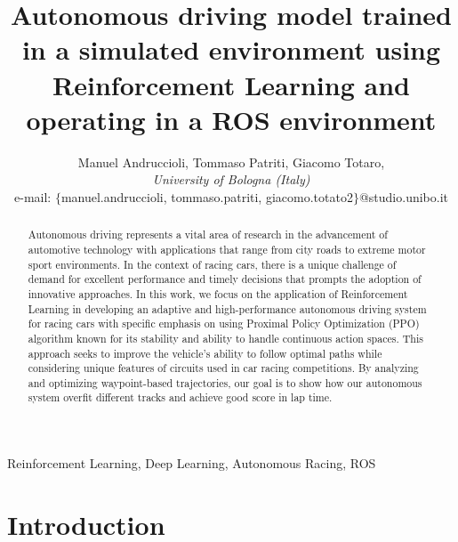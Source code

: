 \documentclass[conference]{IEEEtran}
\begin{document}
\title{
    Autonomous driving model trained in a simulated environment using Reinforcement Learning and operating in a ROS environment
}

\author{Manuel Andruccioli,
Tommaso Patriti,
Giacomo Totaro,\\ 
\textit{University of Bologna (Italy)} \\
e-mail: $\{$manuel.andruccioli, tommaso.patriti, giacomo.totato2$\}$@studio.unibo.it }

\maketitle

\begin{abstract}
Autonomous driving represents a vital area of research in the advancement of automotive technology with applications that range from city roads to extreme motor sport environments.
%
In the context of racing cars, there is a unique challenge of demand for excellent performance and timely decisions that prompts the adoption of innovative approaches.
%
In this work, we focus on the application of Reinforcement Learning in developing an adaptive and high-performance autonomous driving system for racing cars with specific emphasis on using Proximal Policy Optimization (PPO) algorithm known for its stability and ability to handle continuous action spaces.
%
This approach seeks to improve the vehicle's ability to follow optimal paths while considering unique features of circuits used in car racing competitions.
%
By analyzing and optimizing waypoint-based trajectories, our goal is to show how our autonomous system overfit different tracks and achieve good score in lap time.
%
%
%
\end{abstract}


\begin{IEEEkeywords}
    Reinforcement Learning, Deep Learning, Autonomous Racing, ROS
\end{IEEEkeywords}

\section{Introduction}
\end{document}
